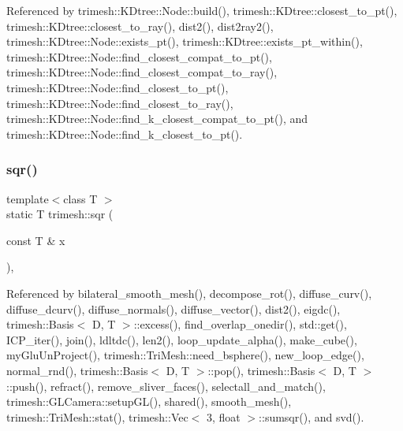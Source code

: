 Referenced by trimesh\+::\+K\+Dtree\+::\+Node\+::build(), trimesh\+::\+K\+Dtree\+::closest\+\_\+to\+\_\+pt(), trimesh\+::\+K\+Dtree\+::closest\+\_\+to\+\_\+ray(), dist2(), dist2ray2(), trimesh\+::\+K\+Dtree\+::\+Node\+::exists\+\_\+pt(), trimesh\+::\+K\+Dtree\+::exists\+\_\+pt\+\_\+within(), trimesh\+::\+K\+Dtree\+::\+Node\+::find\+\_\+closest\+\_\+compat\+\_\+to\+\_\+pt(), trimesh\+::\+K\+Dtree\+::\+Node\+::find\+\_\+closest\+\_\+compat\+\_\+to\+\_\+ray(), trimesh\+::\+K\+Dtree\+::\+Node\+::find\+\_\+closest\+\_\+to\+\_\+pt(), trimesh\+::\+K\+Dtree\+::\+Node\+::find\+\_\+closest\+\_\+to\+\_\+ray(), trimesh\+::\+K\+Dtree\+::\+Node\+::find\+\_\+k\+\_\+closest\+\_\+compat\+\_\+to\+\_\+pt(), and trimesh\+::\+K\+Dtree\+::\+Node\+::find\+\_\+k\+\_\+closest\+\_\+to\+\_\+pt().

\mbox{\label{namespacetrimesh_a51b76a98ab947ef387705b2c10b1c090}} 
\subsubsection{\texorpdfstring{sqr()}{sqr()}\hspace{0.1cm}{\footnotesize\ttfamily [2/2]}}
{\footnotesize\ttfamily template$<$class T $>$ \\
static T trimesh\+::sqr (\begin{DoxyParamCaption}\item[{const T \&}]{x }\end{DoxyParamCaption})\hspace{0.3cm}{\ttfamily [inline]}, {\ttfamily [static]}}



Referenced by bilateral\+\_\+smooth\+\_\+mesh(), decompose\+\_\+rot(), diffuse\+\_\+curv(), diffuse\+\_\+dcurv(), diffuse\+\_\+normals(), diffuse\+\_\+vector(), dist2(), eigdc(), trimesh\+::\+Basis$<$ D, T $>$\+::excess(), find\+\_\+overlap\+\_\+onedir(), std\+::get(), I\+C\+P\+\_\+iter(), join(), ldltdc(), len2(), loop\+\_\+update\+\_\+alpha(), make\+\_\+cube(), my\+Glu\+Un\+Project(), trimesh\+::\+Tri\+Mesh\+::need\+\_\+bsphere(), new\+\_\+loop\+\_\+edge(), normal\+\_\+rnd(), trimesh\+::\+Basis$<$ D, T $>$\+::pop(), trimesh\+::\+Basis$<$ D, T $>$\+::push(), refract(), remove\+\_\+sliver\+\_\+faces(), selectall\+\_\+and\+\_\+match(), trimesh\+::\+G\+L\+Camera\+::setup\+G\+L(), shared(), smooth\+\_\+mesh(), trimesh\+::\+Tri\+Mesh\+::stat(), trimesh\+::\+Vec$<$ 3, float $>$\+::sumsqr(), and svd().

